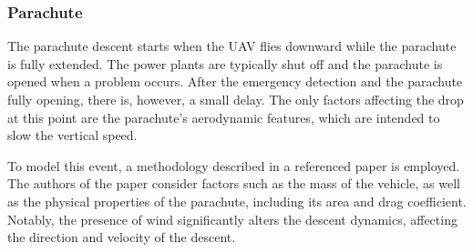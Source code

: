 \documentclass[12pt]{report}
\begin{document}
        \subsubsection{Parachute}
        The parachute descent starts when the UAV flies downward while the parachute is fully extended. The power plants
        are typically shut off and the parachute is opened when a problem occurs. After the emergency detection and the
        parachute fully opening, there is, however, a small delay. The only factors affecting the drop at this point are
        the parachute's aerodynamic features, which are intended to slow the vertical speed.
            
        To model this event, a methodology described in a referenced paper \cite{la_cour-harbo_quantifying_2019}is
        employed. The authors of the paper consider factors such as the mass of the vehicle, as well as the physical
        properties of the parachute, including its area and drag coefficient. Notably, the presence of wind
        significantly alters the descent dynamics, affecting the direction and velocity of the descent.
\end{document}
